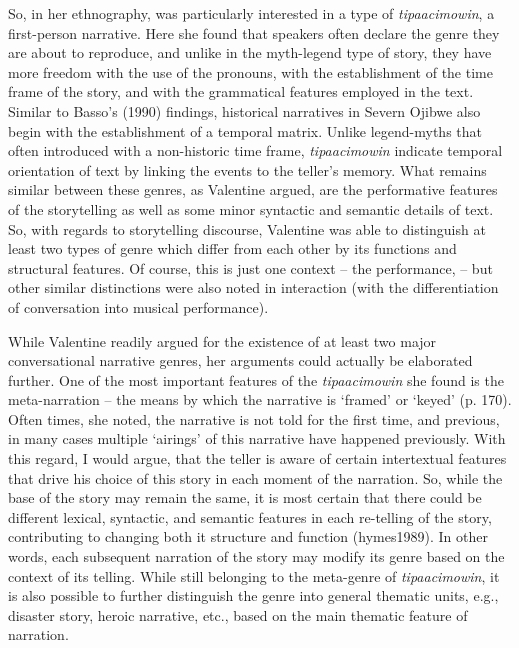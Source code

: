 \documentclass[12pt, draft]{article}
\begin{document}
So, in her ethnography, \textcite{valentine1995} was particularly interested in a type of \textit{tipaacimowin}, a first-person narrative. Here she found that  speakers often declare the genre they are about to reproduce, and unlike in the myth-legend type of story, they have more freedom with the use of the pronouns, with the establishment of the time frame of the story, and with the grammatical features employed in the text. Similar to Basso's (1990) findings, historical narratives in Severn Ojibwe also begin with the establishment of a temporal matrix. Unlike legend-myths that often introduced with a non-historic time frame, \textit{tipaacimowin} indicate temporal orientation of text by linking the events to the teller's memory. What remains similar between these genres, as Valentine argued, are the performative features of the storytelling as well as some minor syntactic and semantic details of text. So, with regards to storytelling discourse, Valentine was able to distinguish at least two types of genre which differ from each other by its functions and structural features. Of course, this is just one context -- the performance, -- but other similar distinctions were also noted in interaction (with the differentiation of conversation into musical performance).

While Valentine readily argued for the existence of at least two major conversational narrative genres, her arguments could actually be elaborated further. One of the most important features of the \textit{tipaacimowin} she found is the meta-narration -- the means by which the narrative is `framed' or `keyed' (p. 170). Often times, she noted, the narrative is not told for the first time, and previous, in many cases multiple `airings' of this narrative have happened previously. With this regard, I would argue, that the teller is aware of certain intertextual features that drive his choice of this story in each moment of the narration. So, while the base of the story may remain the same, it is most certain that there could be different  lexical, syntactic, and semantic features in each re-telling of the story, contributing to changing both it structure and function (hymes1989). In other words, each subsequent narration of the story may modify its genre based on the context of its telling. While still belonging to the meta-genre of \textit{tipaacimowin}, it is also  possible to further distinguish the genre into general thematic units, e.g., disaster story, heroic narrative, etc., based on the main thematic feature of narration.
\end{document}
